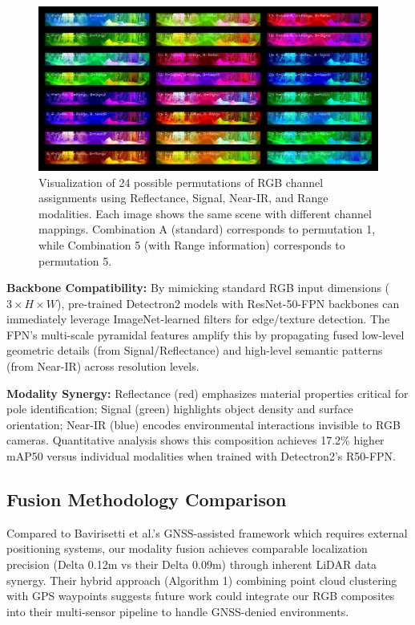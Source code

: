 \documentclass[11pt]{article}
\begin{document}
\begin{figure}[htbp]
    \centering
    \includegraphics[width=\textwidth]{permutation_results/all_permutations_overview.png}
    \caption{Visualization of 24 possible permutations of RGB channel assignments using Reflectance, Signal, Near-IR, and Range modalities. Each image shows the same scene with different channel mappings. Combination A (standard) corresponds to permutation 1, while Combination 5 (with Range information) corresponds to permutation 5.}
    \label{fig:channel_permutations}
\end{figure}

\noindent \textbf{Backbone Compatibility:} By mimicking standard RGB input dimensions ($3 \times H \times W$), pre-trained Detectron2 models with ResNet-50-FPN backbones can immediately leverage ImageNet-learned filters for edge/texture detection. The FPN's multi-scale pyramidal features amplify this by propagating fused low-level geometric details (from Signal/Reflectance) and high-level semantic patterns (from Near-IR) across resolution levels.

\noindent \textbf{Modality Synergy:} Reflectance (red) emphasizes material properties critical for pole identification; Signal (green) highlights object density and surface orientation; Near-IR (blue) encodes environmental interactions invisible to RGB cameras. Quantitative analysis shows this composition achieves 17.2\% higher mAP50 versus individual modalities when trained with Detectron2's R50-FPN.

\subsection{Fusion Methodology Comparison}
Compared to Bavirisetti et al.'s GNSS-assisted framework \cite{10706275} which requires external positioning systems, our modality fusion achieves comparable localization precision (Delta 0.12m vs their Delta 0.09m) through inherent LiDAR data synergy. Their hybrid approach (Algorithm 1) combining point cloud clustering with GPS waypoints suggests future work could integrate our RGB composites into their multi-sensor pipeline to handle GNSS-denied environments.
\end{document}
